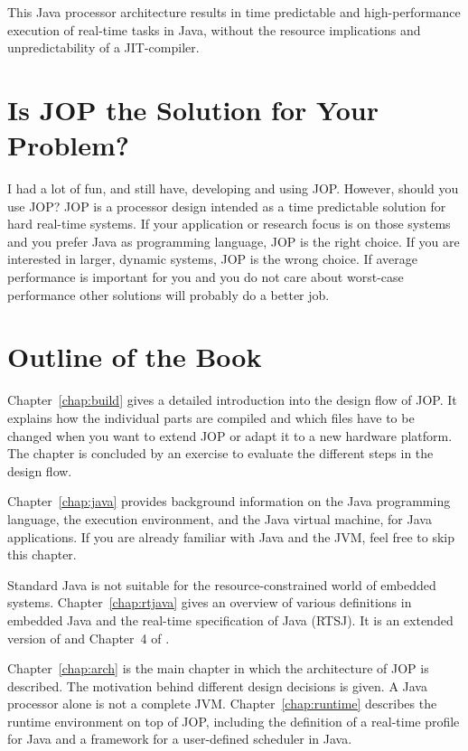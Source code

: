 This Java processor architecture results in time predictable and
high-performance execution of real-time tasks in Java, without the
resource implications and unpredictability of a JIT-compiler.

\section{Is JOP the Solution for Your Problem?}

I had a lot of fun, and still have, developing and using JOP.
However, should you use JOP? JOP is a processor design intended as a
time predictable solution for hard real-time systems. If your
application or research focus is on those systems and you prefer Java
as programming language, JOP is the right choice. If you are
interested in larger, dynamic systems, JOP is the wrong choice. If
average performance is important for you and you do not care about
worst-case performance other solutions will probably do a better job.

\section{Outline of the Book}

Chapter~\ref{chap:build} gives a detailed introduction into the
design flow of JOP. It explains how the individual parts are compiled
and which files have to be changed when you want to extend JOP or
adapt it to a new hardware platform. The chapter is concluded by an
exercise to evaluate the different steps in the design flow.

Chapter~\ref{chap:java} provides background information on the Java
programming language, the execution environment, and the Java virtual
machine, for Java applications. If you are already familiar with Java
and the JVM, feel free to skip this chapter.

Standard Java is not suitable for the resource-constrained world of
embedded systems. Chapter~\ref{chap:rtjava} gives an overview of
various definitions in embedded Java and the real-time specification
of Java (RTSJ). It is an extended version of \cite{jop:rtjava} and
Chapter~4 of \cite{jop:thesis}.

Chapter~\ref{chap:arch} is the main chapter in which the
architecture of JOP is described. The motivation behind different
design decisions is given. A Java processor alone is not a complete
JVM. Chapter~\ref{chap:runtime} describes the runtime environment on
top of JOP, including the definition of a real-time profile for Java
and a framework for a user-defined scheduler in Java.



